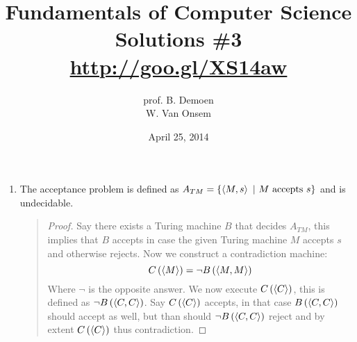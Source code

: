 \documentclass{article}
\title{Fundamentals of Computer Science\\Solutions \#3\\\url{http://goo.gl/XS14aw}}
\author{prof. B. Demoen\\W. Van Onsem}
\date{April 25, 2014}
\begin{document}
\maketitle
\begin{prel}
\begin{enumerate}
\item The acceptance problem is defined as $A_{TM}=\left\{ \left\langle M,s \right\rangle\ |\ \mbox{$M$ accepts $s$} \right\}$ and is undecidable.
\begin{quote}\begin{proof}
Say there exists a Turing machine $B$ that decides $A_{TM}$, this implies that $B$ accepts in case the given Turing machine $M$ accepts $s$ and otherwise rejects. Now we construct a contradiction machine:
\begin{equation}
C\left( \left\langle M \right\rangle \right)=\neg B\left( \left\langle M,M \right\rangle \right)
\end{equation}
Where $\neg$ is the opposite answer. We now execute $C\left( \left\langle C \right\rangle \right)$, this is defined as $\neg B\left( \left\langle C,C \right\rangle \right)$. Say $C\left( \left\langle C \right\rangle \right)$ accepts, in that case $B\left( \left\langle C,C \right\rangle \right)$ should accept as well, but than should $\neg B\left( \left\langle C,C \right\rangle \right)$ reject and by extent $C\left( \left\langle C \right\rangle \right)$ thus contradiction.
\end{proof}\end{quote}

\end{enumerate}
\end{prel}
\end{document}
